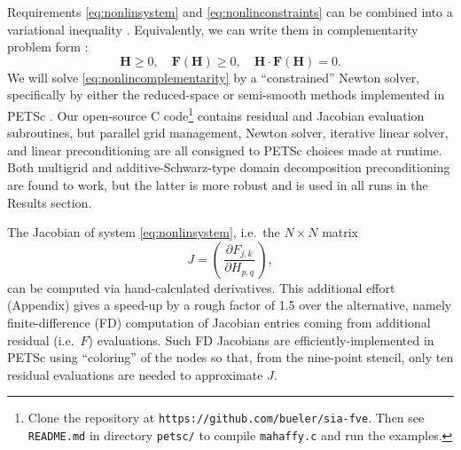 \documentclass[review,letterpaper]{igs}
\newcommand\bF{\mathbf{F}}
\newcommand\bH{\mathbf{H}}
\begin{document}
Requirements \eqref{eq:nonlinsystem} and \eqref{eq:nonlinconstraints} can be combined into a variational inequality \citep{JouvetBueler2012,KinderlehrerStampacchia1980}.  Equivalently, we can write them in complementarity problem form \citep{BensonMunson2006}:
\begin{equation}
\bH \ge 0, \quad \bF(\bH) \ge 0, \quad \bH \cdot \bF(\bH) = 0.  \label{eq:nonlincomplementarity}
\end{equation}
We will solve \eqref{eq:nonlincomplementarity} by a ``constrained'' Newton solver, specifically by either the reduced-space or semi-smooth methods \citep{BensonMunson2006} implemented in PETSc \citep{Balayetal2014}.  Our open-source C code\footnote{Clone the repository at \texttt{https://github.com/bueler/sia-fve}.  Then see \texttt{README.md} in directory \texttt{petsc/} to compile \texttt{mahaffy.c} and run the examples.} contains residual and Jacobian evaluation subroutines, but parallel grid management, Newton solver, iterative linear solver, and linear preconditioning are all consigned to PETSc choices made at runtime.  Both multigrid \citep{Briggsetal2000} and additive-Schwarz-type domain decomposition \citep{Smithetal1996} preconditioning are found to work, but the latter is more robust and is used in all runs in the Results section.

The Jacobian of system \eqref{eq:nonlinsystem}, i.e.~the $N\times N$ matrix
\begin{equation}
J = \left(\,\frac{\partial F_{j,k}}{\partial H_{p,q}}\,\right), \label{eq:nonlinjacobian}
\end{equation}
can be computed via hand-calculated derivatives.  This additional effort (Appendix) gives a speed-up by a rough factor of 1.5 over the alternative, namely finite-difference (FD) computation of Jacobian entries coming from additional residual (i.e.~$F$) evaluations.  Such FD Jacobians are efficiently-implemented in PETSc using ``coloring'' of the nodes \citep{CurtisPowellReid1974} so that, from the nine-point stencil, only ten residual evaluations are needed to approximate $J$.
\end{document}
